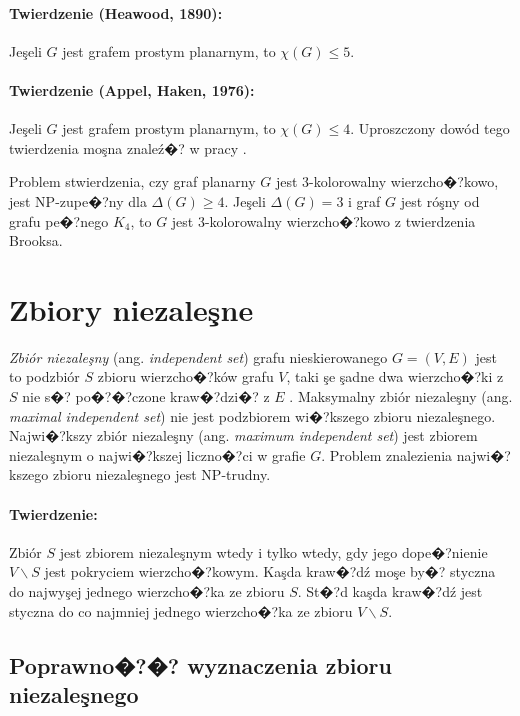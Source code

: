 \documentclass[12pt,a4paper]{mwrep}
\begin{document}
\paragraph{Twierdzenie (Heawood, 1890):} Jeşeli $G$ jest
grafem prostym planarnym, to $\chi(G) \le 5$.

\paragraph{Twierdzenie (Appel, Haken, 1976):} Jeşeli $G$ jest
grafem prostym planarnym, to $\chi(G) \le 4$.
Uproszczony dowód tego twierdzenia moşna znaleź�? w pracy
\cite{1997_Robertson}.

Problem stwierdzenia, czy graf planarny $G$ jest 3-kolorowalny
wierzcho�?kowo, jest NP-zupe�?ny dla $\Delta(G) \ge 4$.
Jeşeli $\Delta(G) = 3$ i graf $G$ jest róşny od grafu pe�?nego $K_4$,
to $G$ jest 3-kolorowalny wierzcho�?kowo z twierdzenia Brooksa.


\section{Zbiory niezaleşne}
\label{sec:independent_set}

\emph{Zbiór niezaleşny} (ang. \emph{independent set})
grafu nieskierowanego $G=(V,E)$ jest to podzbiór $S$
zbioru wierzcho�?ków grafu $V$, taki şe şadne dwa wierzcho�?ki
z $S$ nie s�? po�?�?czone kraw�?dzi�? z $E$
\cite{wiki_independent_set}.
Maksymalny zbiór niezaleşny 
(ang. \emph{maximal independent set}) nie jest podzbiorem
wi�?kszego zbioru niezaleşnego.
Najwi�?kszy zbiór niezaleşny
(ang. \emph{maximum independent set}) jest zbiorem niezaleşnym
o najwi�?kszej liczno�?ci w grafie $G$.
Problem znalezienia najwi�?kszego zbioru niezaleşnego jest NP-trudny.

\paragraph{Twierdzenie:} Zbiór $S$ jest zbiorem niezaleşnym
wtedy i tylko wtedy, gdy jego dope�?nienie $V \backslash S$
jest pokryciem wierzcho�?kowym.
Kaşda kraw�?dź moşe by�? styczna do najwyşej jednego wierzcho�?ka
ze zbioru $S$. St�?d kaşda kraw�?dź jest styczna do co najmniej
jednego wierzcho�?ka ze zbioru $V \backslash S$.

\subsection{Poprawno�?�? wyznaczenia zbioru niezaleşnego}
\end{document}

